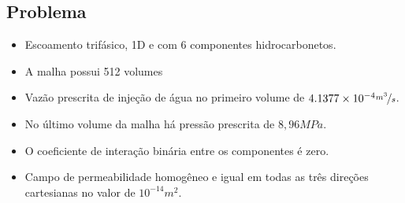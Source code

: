 \documentclass[professionalfont]{beamer}
\begin{document}
    

\subsection{Problema \theproblem}

\begin{frame}{\FrameProblemName}

    \begin{itemize}
        \item Escoamento trifásico, 1D e com 6 componentes hidrocarbonetos. 
        \item A malha possui 512 volumes 
        \item Vazão prescrita de injeção de água no primeiro volume de $4.1377 \times 10^{-4} \nicefrac{m^{3}}{s}$. 
        \item No último volume da malha há pressão prescrita de $8, 96MPa$. 
        \item O coeficiente de interação binária entre os componentes é zero.
        \item  Campo de permeabilidade homogêneo e igual em todas as três direções cartesianas no valor de $10^{-14} m^{2}$.
    \end{itemize}
    
\end{frame}
\end{document}
